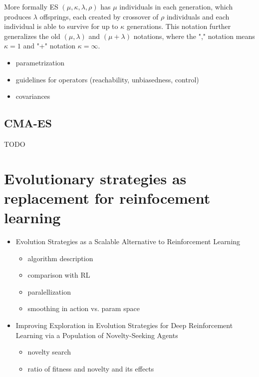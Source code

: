 More formally ES $(\mu,\kappa,\lambda,\rho)$ has $\mu$ individuals in each generation, which produces $\lambda$ offsprings, each created by crossover of $\rho$ individuals and each individual is able to survive for up to $\kappa$ generations. This notation further generalizes the old $(\mu,\lambda)$ and $(\mu+\lambda)$ notations, where the "," notation means $\kappa=1$ and "+" notation $\kappa=\infty$. \cite{Schwefel1995}
\begin{itemize}
    \item parametrization
    \item guidelines for operators (reachability, unbiasedness, control)
    \item covariances
\end{itemize}
     \cite{Rudolph2012}
\subsection{CMA-ES}
\label{subsec:cma-es}
TODO \cite{Hansen06}
\section{Evolutionary strategies as replacement for reinfocement learning}
\label{sec:es-reinf}
\begin{itemize}
    \item Evolution Strategies as a Scalable Alternative to Reinforcement Learning \cite{salimans2017} \begin{itemize}
        \item algorithm description
        \item comparison with RL
        \item paralellization
        \item smoothing in action vs. param space
    \end{itemize}
    \item Improving Exploration in Evolution Strategies for Deep Reinforcement Learning via a Population of Novelty-Seeking Agents \cite{conti2018} \begin{itemize}
        \item novelty search
        \item ratio of fitness and novelty and its effects
    \end{itemize}
\end{itemize}
